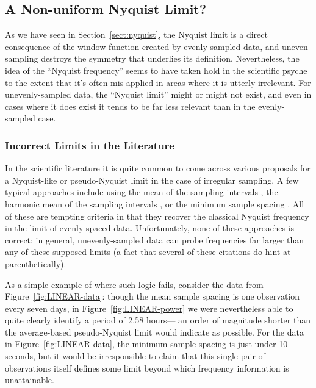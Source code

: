 \documentclass[preprint]{aastex}
\newcommand{\fig}[1]{Figure~\ref{fig:#1}}
\newcommand{\Sect}[1]{Section~\ref{sect:#1}}
\newcommand{\sect}[1]{\Sect{#1}}
\newcommand{\sectlabel}[1]{\label{sect:#1}}
\begin{document}
\subsection{A Non-uniform Nyquist Limit?}
\sectlabel{pseudo-nyquist}

As we have seen in \sect{nyquist}, the Nyquist limit is a direct consequence
of the window function created by evenly-sampled data,
and uneven sampling destroys the symmetry that underlies its definition.
Nevertheless, the idea of the ``Nyquist frequency'' seems to have taken hold
in the scientific psyche to the extent that it's often mis-applied in areas
where it is utterly irrelevant.
For unevenly-sampled data, the ``Nyquist limit'' might or might not exist,
and even in cases where it does exist it tends to be far less relevant than
in the evenly-sampled case.

\subsubsection{Incorrect Limits in the Literature}

In the scientific literature it is quite common to come across various proposals
for a Nyquist-like or pseudo-Nyquist limit in the case of irregular sampling.
A few typical approaches include using the mean of the sampling intervals
\citep[e.g.][]{Scargle82, Horne86, NumRec},
the harmonic mean of the sampling intervals \citep[e.g.][]{Debosscher07},
or the minimum sample spacing \citep[e.g.][]{Percy86, Roberts87, Press89, Hilditch01}.
All of these are tempting criteria in that they recover the classical Nyquist 
frequency in the limit of evenly-spaced data.
Unfortunately, none of these approaches is correct: in general,
unevenly-sampled data can probe frequencies far larger than any of these
supposed limits (a fact that several of these citations do hint at
parenthetically).

As a simple example of where such logic fails,
consider the data from \fig{LINEAR-data}: though the mean sample
spacing is one observation every seven days, in \fig{LINEAR-power}
we were nevertheless able to quite clearly identify a period of 2.58 hours---
an order of magnitude shorter than the average-based pseudo-Nyquist limit
would indicate as possible.
For the data in \fig{LINEAR-data}, the minimum sample spacing is just under 10
seconds, but it would be irresponsible to claim that this single pair of
observations itself defines some limit beyond which frequency information is
unattainable.
\end{document}
